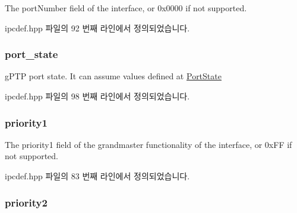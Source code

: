 The port\+Number field of the interface, or 0x0000 if not supported. 



ipcdef.\+hpp 파일의 92 번째 라인에서 정의되었습니다.

\subsubsection[{\texorpdfstring{port\+\_\+state}{port_state}}]{ port\+\_\+state}\hypertarget{structg_ptp_time_data_ae66554126902ed959a3b296ddd3204e8}{}\label{structg_ptp_time_data_ae66554126902ed959a3b296ddd3204e8}


g\+P\+TP port state. It can assume values defined at \hyperlink{ptptypes_8hpp_a679431f1afc75d7bb9e972c022e53672}{Port\+State} 



ipcdef.\+hpp 파일의 98 번째 라인에서 정의되었습니다.

\subsubsection[{\texorpdfstring{priority1}{priority1}}]{ priority1}\hypertarget{structg_ptp_time_data_af98f08e3d1b016cd549310197ba8673c}{}\label{structg_ptp_time_data_af98f08e3d1b016cd549310197ba8673c}


The priority1 field of the grandmaster functionality of the interface, or 0x\+FF if not supported. 



ipcdef.\+hpp 파일의 83 번째 라인에서 정의되었습니다.

\subsubsection[{\texorpdfstring{priority2}{priority2}}]{ priority2}\hypertarget{structg_ptp_time_data_ac04b889463a96b43985cb82020e3c39b}{}\label{structg_ptp_time_data_ac04b889463a96b43985cb82020e3c39b}


